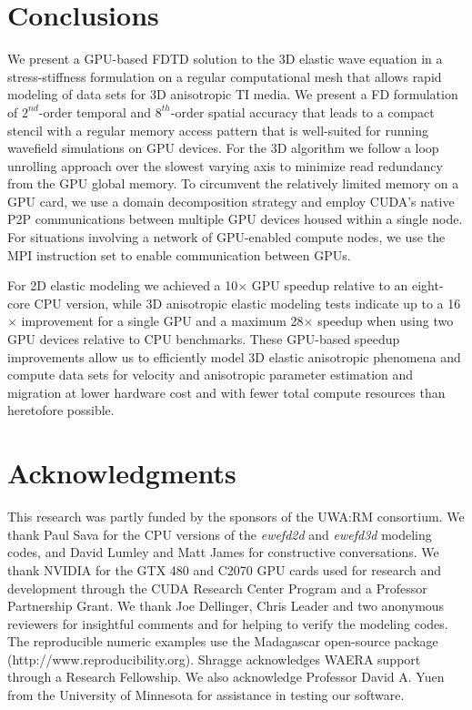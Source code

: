 
\section{Conclusions}

We present a GPU-based FDTD solution to the 3D elastic wave equation in a stress-stiffness formulation on a regular computational mesh that allows rapid modeling of data sets for 3D anisotropic TI media.  We present a FD formulation of $2^{nd}$-order temporal and $8^{th}$-order spatial accuracy that leads to a compact stencil with a regular memory access pattern that is well-suited for running wavefield simulations on GPU devices.  For the 3D algorithm we follow a loop unrolling approach over the slowest varying axis to minimize read redundancy from the GPU global memory.  To circumvent the relatively limited memory on a GPU card, we use a domain decomposition strategy and employ CUDA's native P2P communications between multiple GPU devices housed within a single node.  For situations involving a network of GPU-enabled compute nodes, we use the MPI instruction set to enable communication between GPUs.  

For 2D elastic modeling we achieved a 10$\times$ GPU speedup relative to an eight-core CPU version, while 3D anisotropic elastic modeling tests indicate up to a 16$\times$ improvement for a single GPU and a maximum 28$\times$ speedup when using two GPU devices relative to CPU benchmarks.  These GPU-based speedup improvements allow us to efficiently model 3D elastic anisotropic phenomena and compute data sets for velocity and anisotropic parameter estimation and migration at lower hardware cost and with fewer total compute resources than heretofore possible. 

\section{Acknowledgments}

This research was partly funded by the sponsors of the UWA:RM consortium.  We thank Paul Sava for the CPU versions of the {\it ewefd2d} and {\it ewefd3d} modeling codes, and David Lumley and Matt James for constructive conversations.  We thank NVIDIA for the GTX 480 and C2070 GPU cards used for research and development through the CUDA Research Center Program and a Professor Partnership Grant.  We thank Joe Dellinger, Chris Leader and two anonymous reviewers for insightful comments and for helping to verify the modeling codes. The reproducible numeric examples use the Madagascar open-source package (http://www.reproducibility.org).  Shragge acknowledges WAERA support through a Research Fellowship.  We also acknowledge Professor David A. Yuen from the University of Minnesota for assistance in testing our software.



